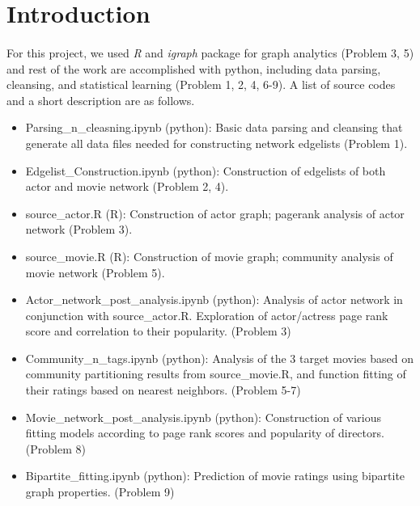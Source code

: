 \section{Introduction}
\paragraph{}
For this project, we used \textit{R} and \textit{igraph} package for graph analytics  (Problem 3, 5) and rest of the work are accomplished with python, including data parsing, cleansing, and statistical learning (Problem 1, 2, 4, 6-9). A list of source codes and a short description are as follows.
\begin{itemize}
	\item Parsing\_n\_cleasning.ipynb (python): Basic data parsing and cleansing that generate all data files needed for constructing network edgelists (Problem 1).
	\item Edgelist\_Construction.ipynb (python): Construction of edgelists of both actor and movie network (Problem 2, 4).
	\item source\_actor.R (R): Construction of actor graph; pagerank analysis of actor network (Problem 3).
	\item source\_movie.R (R): Construction of movie graph; community analysis of movie network  (Problem 5).
	\item Actor\_network\_post\_analysis.ipynb (python): Analysis of actor network in conjunction with source\_actor.R. Exploration of actor/actress page rank score and correlation to their popularity.  (Problem 3)
	\item Community\_n\_tags.ipynb (python): Analysis of the 3 target movies based on community partitioning results from source\_movie.R, and function fitting of their ratings based on nearest neighbors.  (Problem 5-7)
	\item Movie\_network\_post\_analysis.ipynb (python): Construction of various fitting models according to page rank scores and popularity of directors.  (Problem 8)
	\item Bipartite\_fitting.ipynb (python): Prediction of movie ratings using bipartite graph properties.  (Problem 9)

\end{itemize}	